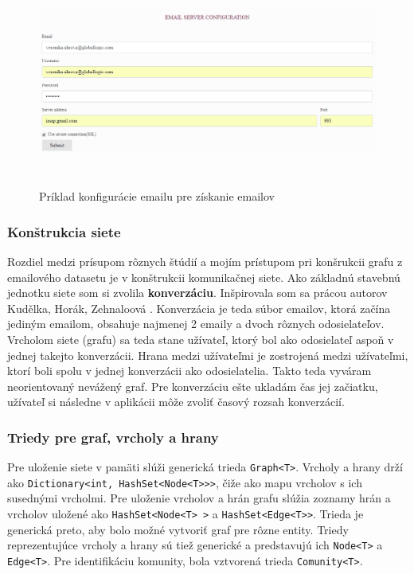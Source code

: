 \documentclass[slovak,master,public,dept460,male,cpdeclaration,oneside]{diploma}
\begin{document}
\begin{figure}[H]
\centering
\includegraphics[width=15cm, height=7cm]{figures/konfiguracia_emailu}
\caption{Príklad konfigurácie emailu pre získanie emailov}
\end{figure}


\subsubsection{Konštrukcia siete}
Rozdiel medzi prísupom rôznych štúdií a mojím prístupom pri konšrukcii grafu z emailového datasetu je v konštrukcii komunikačnej siete. Ako základnú stavebnú jednotku siete som si zvolila \textbf{konverzáciu}. Inšpirovala som sa prácou autorov Kudělka, Horák, Zehnaloová \cite{10}. Konverzácia je teda súbor emailov, ktorá začína jediným emailom, obsahuje najmenej 2 emaily a dvoch rôznych odosielateľov. Vrcholom siete (grafu) sa teda stane užívateľ, ktorý bol ako odosielateľ aspoň v jednej takejto konverzácii. Hrana medzi užívateľmi je zostrojená medzi užívateľmi, ktorí boli spolu v jednej konverzácii ako odosielatelia. Takto teda vyváram neorientovaný nevážený graf. Pre konverzáciu ešte ukladám čas jej začiatku, užívateľ si následne v aplikácii môže zvoliť časový rozsah konverzácií. 

\subsubsection{Triedy pre graf, vrcholy a hrany}
Pre uloženie siete v pamäti slúži generická trieda \texttt{Graph<T>}. Vrcholy a hrany drží ako \texttt{Dictionary<int, HashSet<Node<T>{}>{}>}, čiže ako mapu vrcholov s ich susednými vrcholmi. Pre uloženie vrcholov a hrán grafu slúžia zoznamy hrán a vrcholov uložené ako \texttt{HashSet<Node<T> >} a \texttt{HashSet<Edge<T>{}>}. Trieda je generická preto, aby bolo možné vytvoriť graf pre rôzne entity. Triedy reprezentujúce vrcholy a hrany sú tiež generické a predstavujú ich \texttt{Node<T>} a \texttt{Edge<T>}. Pre identifikáciu komunity, bola vztvorená trieda \texttt{Comunity<T>}.
\end{document}
